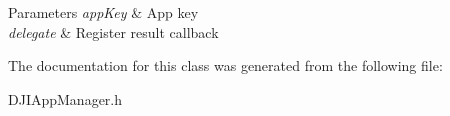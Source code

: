 \begin{DoxyParams}{Parameters}
{\em app\+Key} & App key \\
\hline
{\em delegate} & Register result callback \\
\hline
\end{DoxyParams}


The documentation for this class was generated from the following file\+:\begin{DoxyCompactItemize}
\item 
D\+J\+I\+App\+Manager.\+h\end{DoxyCompactItemize}
